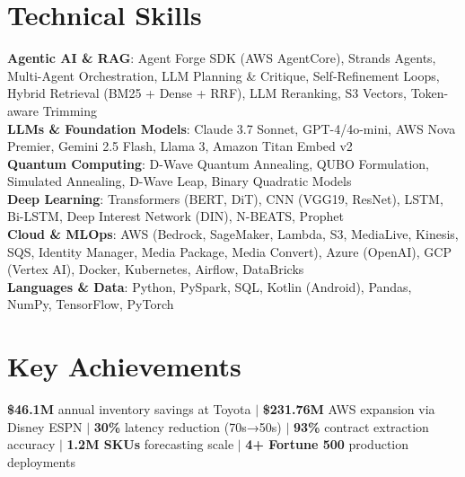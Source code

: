 \documentclass[letterpaper,10pt]{article}
\begin{document}
\section{Technical Skills}
 \begin{itemize}[leftmargin=0.15in, label={}]
    \small{\item{
     \textbf{Agentic AI \& RAG}{: Agent Forge SDK (AWS AgentCore), Strands Agents, Multi-Agent Orchestration, LLM Planning \& Critique, Self-Refinement Loops, Hybrid Retrieval (BM25 + Dense + RRF), LLM Reranking, S3 Vectors, Token-aware Trimming} \\
     \textbf{LLMs \& Foundation Models}{: Claude 3.7 Sonnet, GPT-4/4o-mini, AWS Nova Premier, Gemini 2.5 Flash, Llama 3, Amazon Titan Embed v2} \\
     \textbf{Quantum Computing}{: D-Wave Quantum Annealing, QUBO Formulation, Simulated Annealing, D-Wave Leap, Binary Quadratic Models} \\
     \textbf{Deep Learning}{: Transformers (BERT, DiT), CNN (VGG19, ResNet), LSTM, Bi-LSTM, Deep Interest Network (DIN), N-BEATS, Prophet} \\
     \textbf{Cloud \& MLOps}{: AWS (Bedrock, SageMaker, Lambda, S3, MediaLive, Kinesis, SQS, Identity Manager, Media Package, Media Convert), Azure (OpenAI), GCP (Vertex AI), Docker, Kubernetes, Airflow, DataBricks} \\
     \textbf{Languages \& Data}{: Python, PySpark, SQL, Kotlin (Android), Pandas, NumPy, TensorFlow, PyTorch}
    }}
 \end{itemize}


\section{Key Achievements}
 \begin{itemize}[leftmargin=0.15in, label={}]
    \small{\item{
     \textbf{\$46.1M} annual inventory savings at Toyota $|$ 
     \textbf{\$231.76M} AWS expansion via Disney ESPN $|$ 
     \textbf{30\%} latency reduction (70s→50s) $|$ 
     \textbf{93\%} contract extraction accuracy $|$ 
     \textbf{1.2M SKUs} forecasting scale $|$ 
     \textbf{4+ Fortune 500} production deployments
    }}
 \end{itemize}


\end{document}
